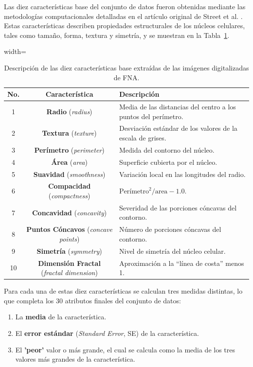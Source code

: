 \documentclass[a4paper,10pt]{book}
\begin{document}
Las diez características base del conjunto de datos fueron obtenidas mediante las metodologías computacionales detalladas en el artículo original de Street et al. \cite{Street1993NuclearFE}. Estas características describen propiedades estructurales de los núcleos celulares, tales como tamaño, forma, textura y simetría, y se muestran en la Tabla~\ref{tab:caracteristicas_base}.
\begin{table}[H]
	\centering
	\begin{adjustbox}{width=\textwidth}
		\begin{tabular}{c c l}
			\toprule
			\textbf{No.} & \textbf{Característica} & \textbf{Descripción} \\
			\midrule
			1 & \textbf{Radio} (\emph{radius}) & Media de las distancias del centro a los puntos del perímetro. \\
			2 & \textbf{Textura} (\emph{texture}) & Desviación estándar de los valores de la escala de grises. \\
			3 & \textbf{Perímetro} (\emph{perimeter}) & Medida del contorno del núcleo. \\
			4 & \textbf{Área} (\emph{area}) & Superficie cubierta por el núcleo. \\
			5 & \textbf{Suavidad} (\emph{smoothness}) & Variación local en las longitudes del radio. \\
			6 & \textbf{Compacidad} (\emph{compactness}) & $\text{Perímetro}^2 / \text{area} -1.0$. \\
			7 & \textbf{Concavidad} (\emph{concavity}) & Severidad de las porciones cóncavas del contorno. \\
			8 & \textbf{Puntos Cóncavos} (\emph{concave points}) & Número de porciones cóncavas del contorno. \\
			9 & \textbf{Simetría} (\emph{symmetry}) & Nivel de simetría del núcleo celular. \\
			10 & \textbf{Dimensión Fractal} (\emph{fractal dimension}) & Aproximación a la ``línea de costa'' menos 1. \\
			\bottomrule
		\end{tabular}
	\end{adjustbox}
	\caption{Descripción de las diez características base extraídas de las imágenes digitalizadas de FNA.}
	\label{tab:caracteristicas_base}
\end{table}
\noindent
Para cada una de estas diez características se calculan tres medidas distintas, lo que completa los 30 atributos finales del conjunto de datos:
\begin{enumerate}
	\item La \textbf{media} de la característica.
	\item El \textbf{error estándar} (\emph{Standard Error}, SE) de la característica.
	\item El \textbf{'peor'} valor o más grande, el cual se calcula como la media de los tres valores más grandes de la característica.
\end{enumerate}
\end{document}

